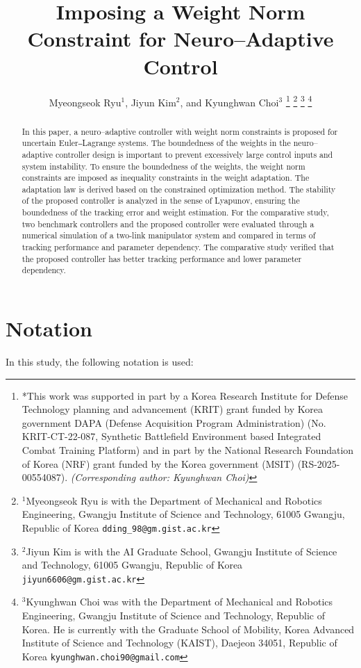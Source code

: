 \documentclass[letterpaper, 10 pt, conference]{ieeeconf}  %
\title{\LARGE \bf
Imposing a Weight Norm Constraint for Neuro–Adaptive Control
}
\author{Myeongseok Ryu$^{1}$, Jiyun Kim$^{2}$, and Kyunghwan Choi$^{3}$%
\thanks{
    *This work was supported in part by a Korea Research Institute for Defense Technology planning and advancement (KRIT) grant funded by Korea government DAPA (Defense Acquisition Program Administration) (No. KRIT-CT-22-087, Synthetic Battlefield Environment based Integrated Combat Training Platform) and in part by the National Research Foundation of Korea (NRF) grant funded by the Korea government (MSIT) (RS-2025-
00554087). \it{(Corresponding author: Kyunghwan Choi)}
}%
\thanks{
    $^{1}$Myeongseok Ryu is with the Department of Mechanical and Robotics Engineering, Gwangju Institute of Science and Technology, 61005 Gwangju, Republic of Korea {\tt\small dding\_98@gm.gist.ac.kr}
}%
\thanks{
    $^{2}$Jiyun Kim is with the AI Graduate School, Gwangju Institute of Science and Technology, 61005 Gwangju, Republic of Korea {\tt\small jiyun6606@gm.gist.ac.kr}
}%
\thanks{
    $^{3}$Kyunghwan Choi was with the Department of Mechanical and Robotics Engineering, Gwangju Institute of Science and Technology, Republic of Korea. He is currently with the Graduate School of Mobility, Korea Advanced Institute of Science and Technology (KAIST), Daejeon 34051, Republic of Korea {\tt\small kyunghwan.choi90@gmail.com}
}%
}
\begin{document}
\maketitle
\thispagestyle{empty}
\pagestyle{empty}

\begin{abstract}

In this paper, a neuro–adaptive controller with weight norm constraints is proposed for uncertain Euler‒Lagrange systems. 
The boundedness of the weights in the neuro–adaptive controller design is important to prevent excessively large control inputs and system instability. 
To ensure the boundedness of the weights, the weight norm constraints are imposed as inequality constraints in the weight adaptation. 
The adaptation law is derived based on the constrained optimization method. 
The stability of the proposed controller is analyzed in the sense of Lyapunov, ensuring the boundedness of the tracking error and weight estimation. 
For the comparative study, two benchmark controllers and the proposed controller were evaluated through a numerical simulation of a two-link manipulator system and compared in terms of tracking performance and parameter dependency. 
The comparative study verified that the proposed controller has better tracking performance and lower parameter dependency.

\end{abstract}



\section*{Notation}
In this study, the following notation is used:
\end{document}
